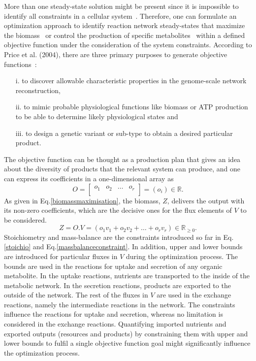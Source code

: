More than one steady-state solution might be present since it is impossible to identify all constraints in a cellular system~\cite{KAUFFMAN2003491}. Therefore, one can formulate an optimization approach to identify reaction network steady-states that maximize the biomass~\cite{KAUFFMAN2003491,PRICE2004} or control the production of specific metabolites~\cite{VARMA1993} within a defined objective function under the consideration of the system constraints. According to Price et al. (2004),
there are three primary purposes to generate objective functions~\cite{PRICE2004}:
\begin{itemize}
	\item[i.] to discover allowable characteristic properties in the genome-scale network reconstruction,
	\item[ii.] to mimic probable physiological functions like biomass or ATP production to be able to determine likely physiological states and
	\item[iii.] to design a genetic variant or sub-type to obtain a desired particular product.
\end{itemize}

The objective function can be thought as a production plan that gives an idea about the diversity of products that the relevant system can produce, and one can express its coefficients in a one-dimensional array as
\begin{equation} \tag{4}
	O =  \begin{bmatrix}
		o_{1} & o_{2} & \dots  & o_{r}\\
	\end{bmatrix}=(o_{i})\in \mathbb{R}.
	\label{objectivecoefficients}
\end{equation}
As given in Eq.\eqref{biomassmaximisation}, the biomass, $Z$, delivers the output with its non-zero coefficients, which are the decisive ones for the flux elements of $V$ to be considered.
\begin{equation} \tag{5}
	Z = O.V = (o_{1}v_{1} + o_{2}v_{2} + \dots + o_{r}v_{r})\in \mathbb{R}_{\ge0}.
	\label{biomassmaximisation}
\end{equation}
Stoichiometry and mass-balance are the constraints introduced so far in Eq.\eqref{stoichio} and Eq.\eqref{massbalanceconstraint}. In addition, upper and lower bounds are introduced for particular fluxes in $V$ during the optimization process. The bounds are used in the reactions for uptake and secretion of any organic metabolite. In the uptake reactions, nutrients are transported to the inside of the metabolic network. In the secretion reactions, products are exported to the outside of the network. The rest of the fluxes in $V$ are used in the exchange reactions, namely the intermediate reactions in the network. The constraints influence the reactions for uptake and secretion, whereas no limitation is considered in the exchange reactions. Quantifying imported nutrients and exported outputs (resources and products) by constraining them with upper and lower bounds to fulfil a single objective function goal might significantly influence the optimization process.

